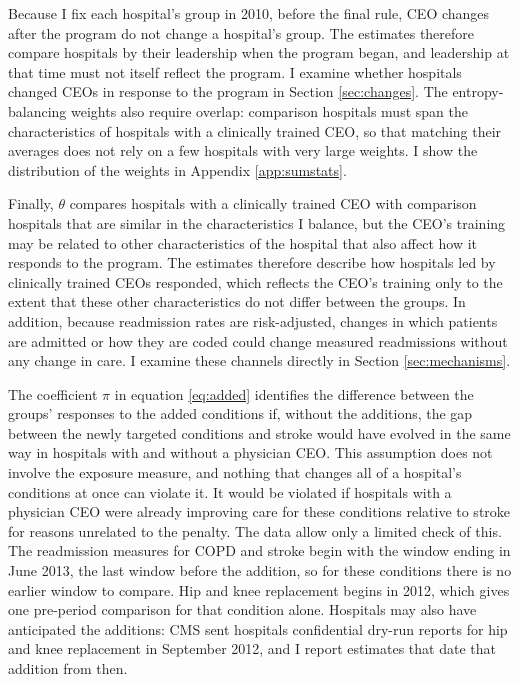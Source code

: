 \documentclass[12pt]{article}
\theoremstyle{definition}   %
\begin{document}
Because I fix each hospital's group in 2010, before the final rule, CEO changes after the program do not change a hospital's group. The estimates therefore compare hospitals by their leadership when the program began, and leadership at that time must not itself reflect the program. I examine whether hospitals changed CEOs in response to the program in Section \ref{sec:changes}. The entropy-balancing weights also require overlap: comparison hospitals must span the characteristics of hospitals with a clinically trained CEO, so that matching their averages does not rely on a few hospitals with very large weights. I show the distribution of the weights in Appendix \ref{app:sumstats}.

Finally, $\theta$ compares hospitals with a clinically trained CEO with comparison hospitals that are similar in the characteristics I balance, but the CEO's training may be related to other characteristics of the hospital that also affect how it responds to the program. The estimates therefore describe how hospitals led by clinically trained CEOs responded, which reflects the CEO's training only to the extent that these other characteristics do not differ between the groups. In addition, because readmission rates are risk-adjusted, changes in which patients are admitted or how they are coded could change measured readmissions without any change in care. I examine these channels directly in Section \ref{sec:mechanisms}.

The coefficient $\pi$ in equation \eqref{eq:added} identifies the difference between the groups' responses to the added conditions if, without the additions, the gap between the newly targeted conditions and stroke would have evolved in the same way in hospitals with and without a physician CEO. This assumption does not involve the exposure measure, and nothing that changes all of a hospital's conditions at once can violate it. It would be violated if hospitals with a physician CEO were already improving care for these conditions relative to stroke for reasons unrelated to the penalty. The data allow only a limited check of this. The readmission measures for COPD and stroke begin with the window ending in June 2013, the last window before the addition, so for these conditions there is no earlier window to compare. Hip and knee replacement begins in 2012, which gives one pre-period comparison for that condition alone. Hospitals may also have anticipated the additions: CMS sent hospitals confidential dry-run reports for hip and knee replacement in September 2012, and I report estimates that date that addition from then.
\end{document}
